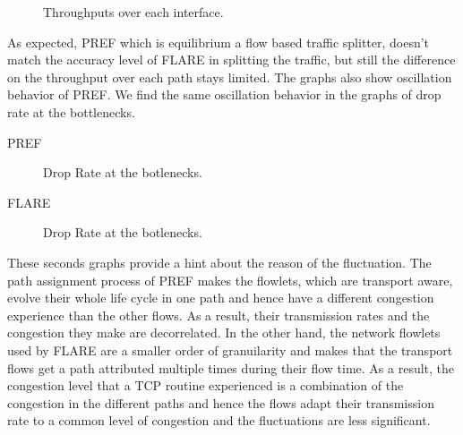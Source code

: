  \begin{figure}[h!]
 \begin{center}
\caption{
  Throughputs over each interface.
    \label{fig:equal-thro-flare}
}
\end{center}

\end{figure}


As expected, PREF which is equilibrium a flow based traffic splitter, doesn't match the accuracy level of FLARE in splitting the traffic, but still the difference on the throughput over each path stays limited. The graphs also show oscillation behavior of PREF. We find the same oscillation behavior in the graphs of drop rate at the bottlenecks.

PREF

\begin{figure}[h]
 \begin{center}

\caption{
  Drop Rate at the botlenecks.
    \label{fig:equal-thro-pref}
}
\end{center}
\end{figure}

FLARE
 \begin{figure}[h!]
 \begin{center}
\caption{
  Drop Rate at the botlenecks.
    \label{fig:equal-thro-flare}
}
\end{center}
\end{figure}

These seconds graphs provide a hint about the reason of the fluctuation. The path assignment process of PREF makes the flowlets, which are transport aware, evolve their whole life cycle in one path and hence have a different congestion experience than the other flows. As a result, their transmission rates and the congestion they make are decorrelated. In the other hand, the network flowlets used by FLARE are a smaller order of granuilarity and makes that the transport flows get a path attributed multiple times during their flow time. As a result, the congestion level that a TCP routine experienced is a combination of the congestion in the different paths and hence the flows adapt their transmission rate to a common level of congestion and the fluctuations are less significant.

